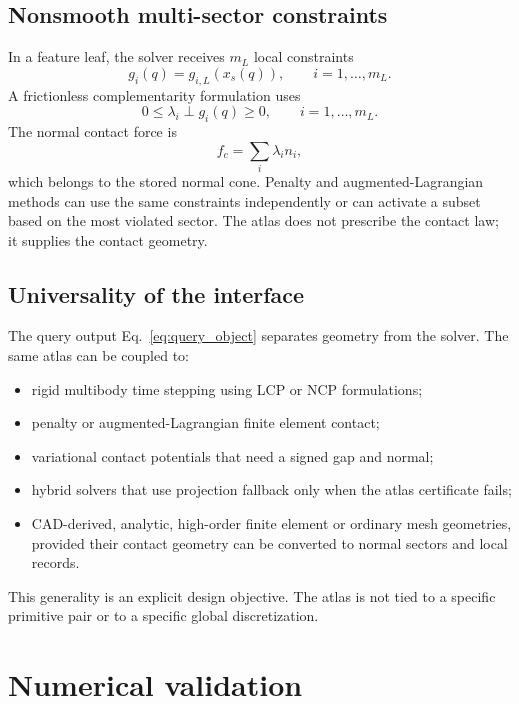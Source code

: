 \documentclass[preprint,12pt,sort&compress]{elsarticle}
\begin{document}
\subsection{Nonsmooth multi-sector constraints}

In a feature leaf, the solver receives $m_L$ local constraints
\begin{equation}
 g_i(q)=g_{i,L}(x_s(q)), \qquad i=1,\ldots,m_L.
\end{equation}
A frictionless complementarity formulation uses
\begin{equation}
 0\leq \lambda_i \perp g_i(q)\geq0,\qquad i=1,\ldots,m_L.
\label{eq:feature_lcp}
\end{equation}
The normal contact force is
\begin{equation}
 f_c=\sum_i \lambda_i n_i,
\end{equation}
which belongs to the stored normal cone. Penalty and augmented-Lagrangian methods can use the same constraints independently or can activate a subset based on the most violated sector. The atlas does not prescribe the contact law; it supplies the contact geometry.

\subsection{Universality of the interface}

The query output Eq.~\eqref{eq:query_object} separates geometry from the solver. The same atlas can be coupled to:
\begin{itemize}[leftmargin=1.6em]
\item rigid multibody time stepping using LCP or NCP formulations;
\item penalty or augmented-Lagrangian finite element contact;
\item variational contact potentials that need a signed gap and normal;
\item hybrid solvers that use projection fallback only when the atlas certificate fails;
\item CAD-derived, analytic, high-order finite element or ordinary mesh geometries, provided their contact geometry can be converted to normal sectors and local records.
\end{itemize}
This generality is an explicit design objective. The atlas is not tied to a specific primitive pair or to a specific global discretization.

\section{Numerical validation}
\label{sec:numerical}
\end{document}
